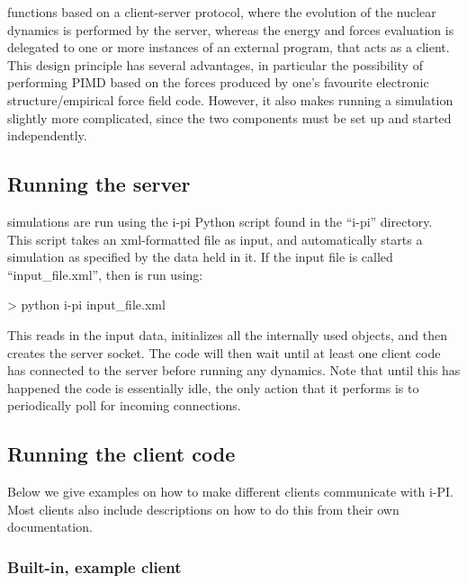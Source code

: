 \documentclass[11pt,english,fleqn]{report}
\newenvironment{code}{%
\footnotesize
\verbatim
}{
\endverbatim
\normalsize
}
\begin{document}
\ipi functions based on a client-server protocol, where the evolution of the nuclear dynamics
is performed by the \ipi server, whereas the energy and forces evaluation is delegated to
one or more instances of an external program, that acts as a client. This design principle
has several advantages, in particular the possibility of performing PIMD based on the forces
produced by one's favourite electronic structure/empirical force field code. However, it
also makes running a simulation slightly more complicated, since the two components
must be set up and started independently.

\subsection{Running the \ipi server}

\label{runningsimulations}

\ipi simulations are run using the i-pi Python script found in the
{}``i-pi'' directory. This script takes an xml-formatted file as
input, and automatically starts a simulation as specified by the data
held in it. If the input file is called {}``input\_file.xml'', then
\ipi is run using:

\begin{code}
> python i-pi input_file.xml
\end{code}

This reads in the input data, initializes all the internally used
objects, and then creates the server socket. The code will then wait
until at least one client code has connected to the server before
running any dynamics. Note that until this has happened the code is
essentially idle, the only action that it performs is to periodically
poll for incoming connections.


\subsection{Running the client code}

\label{runningclients}

Below we give examples on how to make different clients communicate with i-PI.
Most clients also include descriptions on how to do this from their own documentation.

\subsubsection{Built-in, example client}

\label{driver.x}
\end{document}
